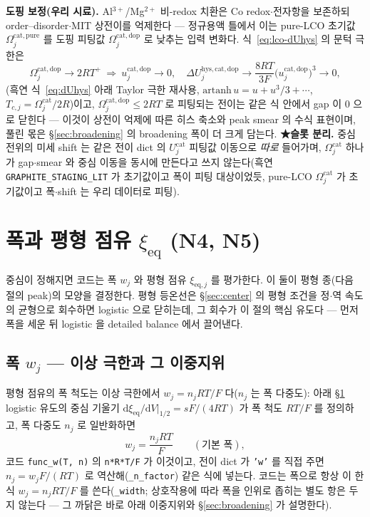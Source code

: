 \documentclass[11pt,a4paper]{article}
\newcommand{\dd}{\mathrm{d}}
\newcommand{\eq}{\mathrm{eq}}
\newcommand{\hys}{\mathrm{hys}}
\newcommand{\code}[1]{\texttt{#1}}
\begin{document}
\textbf{도핑 보정(우리 시료).}
Al$^{3+}$/Mg$^{2+}$ 비-redox 치환은 Co redox$\cdot$전자항을 보존하되 order--disorder$\cdot$MIT 상전이를
억제한다 — 정규용액 틀에서 이는 pure-LCO 초기값 $\Omega_j^\mathrm{cat,pure}$ 를 도핑 피팅값
$\Omega_j^\mathrm{cat,dop}$ 로 낮추는 입력 변화다. 식~\eqref{eq:lco-dUhys} 의 문턱 극한은
\begin{equation}
\Omega_j^\mathrm{cat,dop}\to2RT^+\ \Longrightarrow\
u_j^\mathrm{cat,dop}\to0,\quad
\Delta U_j^{\hys,\mathrm{cat,dop}}\to\frac{8RT}{3F}\big(u_j^\mathrm{cat,dop}\big)^3\to0,
\label{eq:lco-dope}
\end{equation}
(흑연 식~\eqref{eq:dUhys} 아래 Taylor 극한 재사용, $\mathrm{artanh}\,u=u+u^3/3+\cdots$,
$T_{c,j}=\Omega_j^\mathrm{cat}/2R$)이고, $\Omega_j^\mathrm{cat,dop}\le2RT$ 로 피팅되는 전이는 같은 식 안에서
gap 이 0 으로 닫힌다 — 이것이 상전이 억제에 따른 히스 축소와 peak smear 의 수식 표현이며, 풀린 몫은
\S\ref{sec:broadening} 의 broadening 폭이 더 크게 담는다. \textbf{★슬롯 분리.} 중심 전위의 미세 shift 는
같은 전이 dict 의 $U_j^\mathrm{cat}$ 피팅값 이동으로 \emph{따로} 들어가며, $\Omega_j^\mathrm{cat}$ 하나가
gap$\cdot$smear 와 중심 이동을 동시에 만든다고 쓰지 않는다(흑연 \code{GRAPHITE\_STAGING\_LIT} 가 초기값이고
폭이 피팅 대상이었듯, pure-LCO $\Omega_j^\mathrm{cat}$ 가 초기값이고 폭$\cdot$shift 는 우리 데이터로 피팅).

\section{폭과 평형 점유 $\xi_\eq$ (N4, N5)}\label{sec:width}
중심이 정해지면 코드는 폭 $w_j$ 와 평형 점유 $\xi_{\eq,j}$ 를 평가한다. 이 둘이 평형 종(다음 절의 peak)의 모양을
결정한다. 평형 등온선은 \S\ref{sec:center} 의 평형 조건을 정$\cdot$역 속도의 균형으로 회수하면 logistic 으로 닫히는데,
그 회수가 이 절의 핵심 유도다 — 먼저 폭을 세운 뒤 logistic 을 detailed balance 에서 끌어낸다.

\subsection{폭 $w_j$ — 이상 극한과 그 이중지위}
평형 점유의 폭 척도는 이상 극한에서 $w_j=n_jRT/F$ 다($n_j$ 는 폭 다중도): 아래 \S\ref{sec:width} logistic 유도의
중심 기울기 $\dd\xi_\eq/\dd V|_{1/2}=sF/(4RT)$ 가 폭 척도 $RT/F$ 를 정의하고, 폭 다중도 $n_j$ 로 일반화하면
\begin{equation}
w_j=\frac{n_jRT}{F}\qquad(\text{기본 폭}),
\label{eq:wbase}
\end{equation}
코드 \code{func\_w(T, n)} 의 \code{n*R*T/F}
가 이것이고, 전이 dict 가 \code{'w'} 를 직접 주면 $n_j=w_jF/(RT)$ 로 역산해(\code{\_n\_factor}) 같은 식에 넣는다.
코드는 폭으로 항상 이 한 식 $w_j=n_jRT/F$ 를 쓴다(\code{\_width}; 상호작용에 따라 폭을 인위로 좁히는 별도 항은 두지
않는다 — 그 까닭은 바로 아래 이중지위와 \S\ref{sec:broadening} 가 설명한다).
\end{document}

